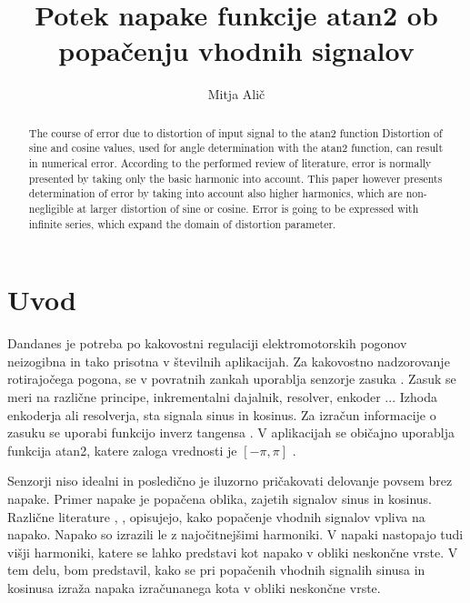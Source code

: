 \documentclass[a4paper]{article}
\begin{document}
\title{Potek napake funkcije atan2 ob popačenju vhodnih signalov}

\author{Mitja Alič} %



\maketitle


\begin{abstract}{The course of error due to distortion of input signal to the atan2 function}
Distortion of sine and cosine values, used for angle determination with the atan2 function, can result in numerical error. According to the performed review of literature, error is normally presented by taking only the basic harmonic into account. This paper however presents determination of error by taking into account also higher harmonics, which are non-negligible at larger distortion of sine or cosine. Error is going to be expressed with infinite series, which expand the domain of distortion parameter. 
\end{abstract}



\section{Uvod}

Dandanes je potreba po kakovostni regulaciji elektromotorskih pogonov neizogibna in tako prisotna v številnih aplikacijah. Za kakovostno nadzorovanje rotirajočega pogona, se v povratnih zankah uporablja senzorje zasuka \cite{uporaba_senzorjev}. Zasuk se meri na različne principe, inkrementalni dajalnik, resolver, enkoder \cite{inkrementalni}\cite{resolver}\cite{enkoder}... Izhoda enkoderja ali resolverja, sta signala sinus in kosinus. Za izračun informacije o zasuku se uporabi funkcijo inverz tangensa \cite{mat1}. V aplikacijah se običajno uporablja funkcija atan2, katere zaloga vrednosti je $[-\pi, \pi]$ \cite{atan}. 


Senzorji niso idealni in posledično je iluzorno pričakovati delovanje povsem brez napake. Primer napake je popačena oblika, zajetih signalov sinus in kosinus. Različne literature \cite{RLS1}, \cite{RLS2}, \cite{RLS3} opisujejo, kako popačenje vhodnih signalov vpliva na napako. Napako so izrazili le z najočitnejšimi harmoniki. V napaki nastopajo tudi višji harmoniki, katere se lahko predstavi kot napako v obliki neskončne vrste.
V tem delu, bom predstavil, kako se pri popačenih vhodnih signalih sinusa in kosinusa  izraža napaka izračunanega kota v obliki neskončne vrste.
\end{document}
